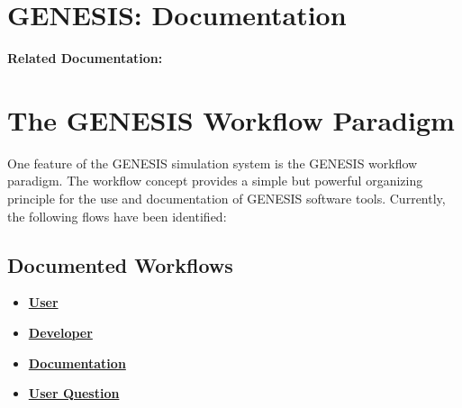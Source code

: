 \documentclass[12pt]{article}
\begin{document}
\section*{GENESIS: Documentation}

{\bf Related Documentation:}

\section*{The GENESIS Workflow Paradigm}

One feature of the GENESIS simulation system is the GENESIS workflow paradigm. The workflow concept provides a simple but powerful organizing principle for the use and documentation of GENESIS software tools. Currently, the following flows have been identified:

\subsection*{Documented Workflows}
\begin{itemize}
\item \href{../workflow-user/workflow-user.tex}{\bf User}
\item \href{../workflow-developer/workflow-developer.tex}{\bf Developer}
\item \href{../workflow-documentation/workflow-documentation.tex}{\bf Documentation}
\item \href{../workflow-user-query/workflow-user-query.tex}{\bf User Question}
\end{itemize}
\end{document}
